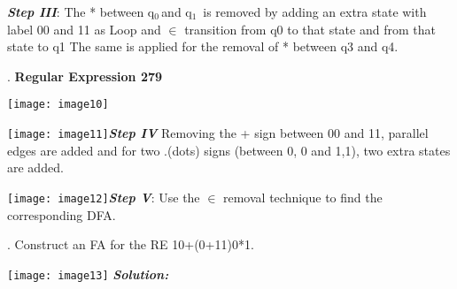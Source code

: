 \noindent 

\noindent 

\noindent 

\noindent \textbf{\textit{Step III}}: The * between q${}_{0\ }$and q${}_{1\ }$ is removed by adding an extra state with label 00 and 11 as Loop and $\mathrm{\in }$ transition from q0 to that state and from that state to q1 The same is applied for the removal of * between q3 and q4.

\noindent . \textbf{Regular Expression {\textbar} 279}

\noindent \texttt{[image: image10]}

\noindent 

\noindent 

\noindent 

\noindent 

\noindent \texttt{[image: image11]}\textbf{\textit{Step IV  }}Removing the + sign between 00 and 11, parallel edges are added and for two .(dots) signs (between 0, 0 and 1,1), two extra states are added.

\noindent 

\noindent 

\noindent 

\noindent 

\noindent 

\noindent \texttt{[image: image12]}\textbf{\textit{Step V}}: Use the $\mathrm{\in }$ removal technique to find the corresponding DFA.

\noindent 

\noindent 

\noindent 

\noindent 

\noindent 

\noindent 

\noindent 

\noindent 

. Construct an FA for the RE 10+(0+11)0*1.

\noindent \texttt{[image: image13]} \textbf{\textit{Solution:}}

\noindent \textbf{\textit{}}

\noindent \textbf{\textit{}}

